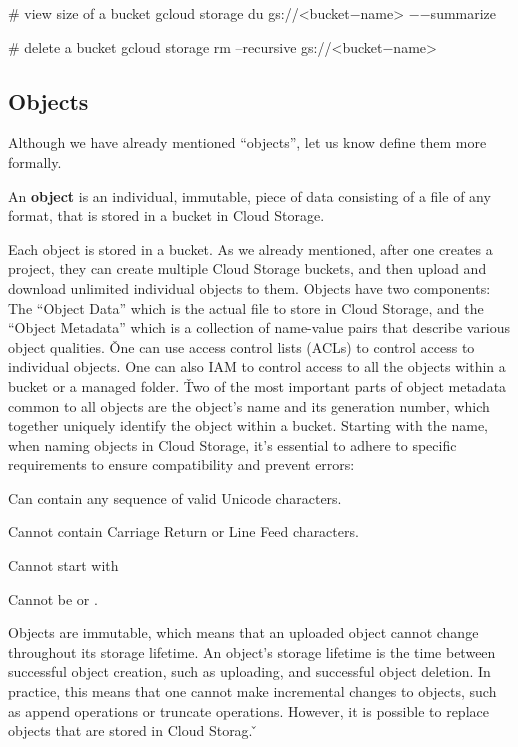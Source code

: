 \begin{bash}
# view size of a bucket
gcloud storage du gs://<bucket$-$name> $-$$-$summarize
\end{bash}

\begin{bash}
# delete a bucket
gcloud storage rm --recursive gs://<bucket$-$name>
\end{bash}

\subsection{Objects}

Although we have already mentioned ``objects'', let us know define them more formally.

\bd[Object]
An \textbf{object} is an individual, immutable, piece of data consisting of a file of any format, that is stored in a
bucket in Cloud Storage.
\ed

Each object is stored in a bucket. As we already mentioned, after one creates a project, they can create multiple Cloud
Storage buckets, and then upload and download unlimited individual objects to them. Objects have two components: The
``Object Data'' which is the actual file to store in Cloud Storage, and the ``Object Metadata'' which is a collection of
name-value pairs that describe various object qualities. \v

One can use access control lists (ACLs) to control access to individual objects. One can also IAM to control access to
all the objects within a bucket or a managed folder. \v

Two of the most important parts of object metadata common to all objects are the object's name and its generation
number,
which together uniquely identify the object within a bucket. Starting with the name, when naming objects in Cloud
Storage,
it's essential to adhere to specific requirements to ensure compatibility and prevent errors:
\bit
\item Can contain any sequence of valid Unicode characters.
\item Cannot contain Carriage Return or Line Feed characters.
\item Cannot start with 
\item Cannot be  or .
\eit

Objects are immutable, which means that an uploaded object cannot change throughout its storage lifetime. An
object's storage lifetime is the time between successful object creation, such as uploading, and successful object
deletion. In practice, this means that one cannot make incremental changes to objects, such as append operations or
truncate operations. However, it is possible to replace objects that are stored in Cloud Storag. \v

